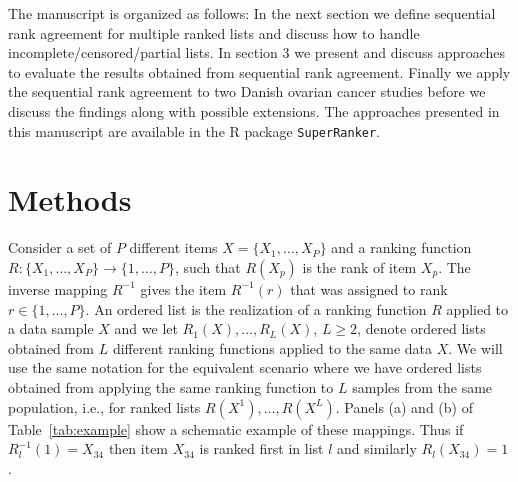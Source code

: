 \documentclass[12pt,a4paper]{article}
\theoremstyle{plain}
\begin{document}
The manuscript is organized as follows: In the next section we define
sequential rank agreement for multiple ranked lists and discuss how to
handle incomplete/censored/partial lists. In section 3 we present and
discuss approaches to evaluate the results obtained from sequential
rank agreement. Finally we apply the sequential rank agreement to two
Danish ovarian cancer studies before we discuss the findings along
with possible extensions. The approaches presented in this manuscript
are available in the R package \texttt{SuperRanker}.


\section{Methods}

Consider a set of $P$ different items $X=\{X_1,\dots,X_P\}$ and a
ranking function $R: \{X_1,\dots,X_P\}\to \{1,\dots,P\}$, such that
$R(X_p)$ is the rank of item $X_p$. The inverse mapping $R^{-1}$ gives
the item $R^{-1}(r)$ that was assigned to rank $r\in\{1,\dots,P\}$. An
ordered list is the realization of a ranking function $R$ applied to a
data sample $X$ and we let $R_1(X),\dots,R_L(X)$, $L\geq2$, denote
ordered lists obtained from $L$ different ranking functions applied to
the same data $X$. We will use the same notation for the equivalent
scenario where we have ordered lists obtained from applying the same
ranking function to $L$ samples from the same population, i.e., for
ranked lists $R(X^1), \ldots, R(X^L)$.  Panels (a) and (b) of
Table~\ref{tab:example} show a schematic example of these
mappings. Thus if $R_l^{-1}(1)=X_{34}$ then item $X_{34}$ is ranked
first in list $l$ and similarly $R_l(X_{34})=1$.
\end{document}
